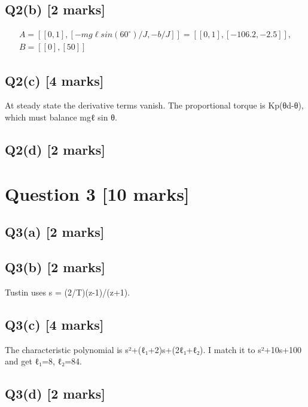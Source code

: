 \documentclass[11pt,a4paper]{article}
\begin{document}
\subsection*{Q2(b) \hfill [2 marks]}

\[\begin{aligned}A = [[0,1], [-mg\ell sin(60^{\circ})/J, -b/J]] = [[0,1], [-106.2, -2.5]],\\ B = [[0],[50]]\end{aligned}\]

\subsection*{Q2(c) \hfill [4 marks]}

At steady state the derivative terms vanish.
The proportional torque is Kp(θd-θ), which must balance mgℓ sin θ.

\subsection*{Q2(d) \hfill [2 marks]}

\vspace{2mm}

\section*{Question 3 \hfill [10 marks]}
\subsection*{Q3(a) \hfill [2 marks]}

\vspace{2mm}

\subsection*{Q3(b) \hfill [2 marks]}

Tustin uses s = (2/T)(z-1)/(z+1).

\subsection*{Q3(c) \hfill [4 marks]}

The characteristic polynomial is s²+(ℓ₁+2)s+(2ℓ₁+ℓ₂).
I match it to s²+10s+100 and get ℓ₁=8, ℓ₂=84.

\subsection*{Q3(d) \hfill [2 marks]}
\end{document}
